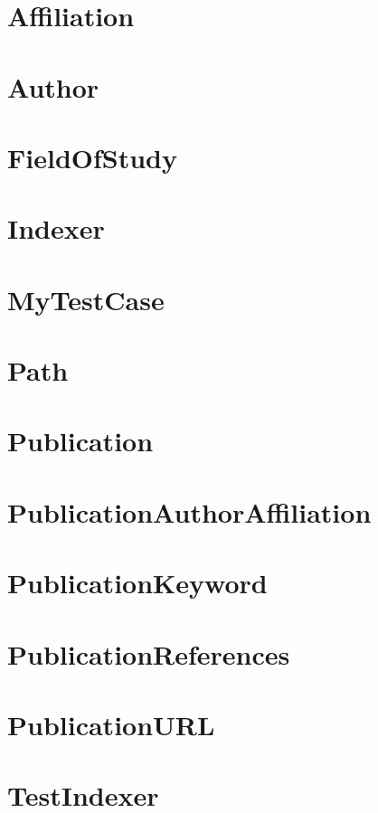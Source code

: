 \documentclass{article}
\begin{document}
\section{Affiliation}

\section{Author}

\section{FieldOfStudy}

\section{Indexer}

\section{MyTestCase}

\section{Path}

\section{Publication}

\section{PublicationAuthorAffiliation}

\section{PublicationKeyword}

\section{PublicationReferences}

\section{PublicationURL}

\section{TestIndexer}

\end{document}
